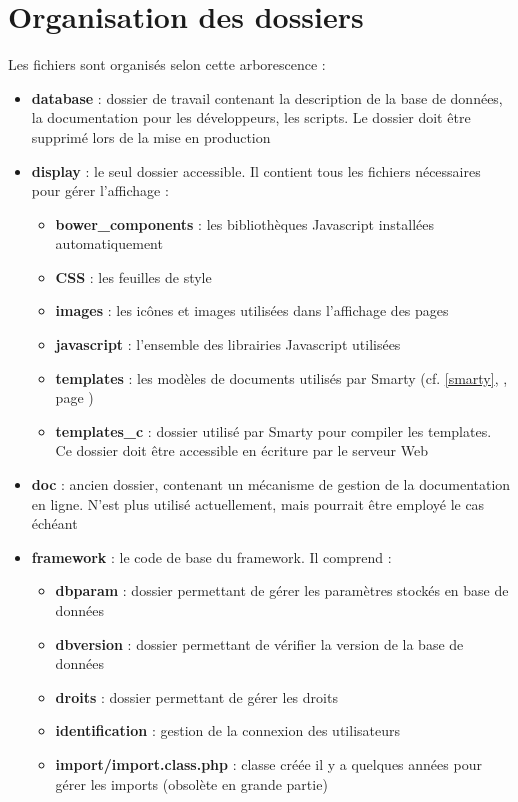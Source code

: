 \section{Organisation des dossiers}
Les fichiers sont organisés selon cette arborescence :
\begin{itemize}
\item \textbf{database} : dossier de travail contenant la description de la base de données, la documentation pour les développeurs, les scripts. Le dossier doit être supprimé lors de la mise en production
\item \textbf{display} : le seul dossier accessible. Il contient tous les fichiers nécessaires pour gérer l'affichage :
\begin{itemize}
\item \textbf{bower\_components} : les bibliothèques Javascript installées automatiquement
\item \textbf{CSS} : les feuilles de style
\item \textbf{images} : les icônes et images utilisées dans l'affichage des pages
\item \textbf{javascript} : l'ensemble des librairies Javascript utilisées
\item \textbf{templates} : les modèles de documents utilisés par Smarty (cf. \ref{smarty}, \textit{}, page \pageref{smarty})
\item \textbf{templates\_c} : dossier utilisé par Smarty pour compiler les templates. Ce dossier doit être accessible en écriture par le serveur Web
\end{itemize}
\item \textbf{doc} : ancien dossier, contenant un mécanisme de gestion de la documentation en ligne. N'est plus utilisé actuellement, mais pourrait être employé le cas échéant
\item \textbf{framework} : le code de base du framework. Il comprend :
\begin{itemize}
\item \textbf{dbparam} : dossier permettant de gérer les paramètres stockés en base de données
\item \textbf{dbversion} : dossier permettant de vérifier la version de la base de données
\item \textbf{droits} : dossier permettant de gérer les droits 
\item \textbf{identification} : gestion de la connexion des utilisateurs
\item \textbf{import/import.class.php} : classe créée il y a quelques années pour gérer les imports (obsolète en grande partie)

\end{itemize}
\end{itemize}
